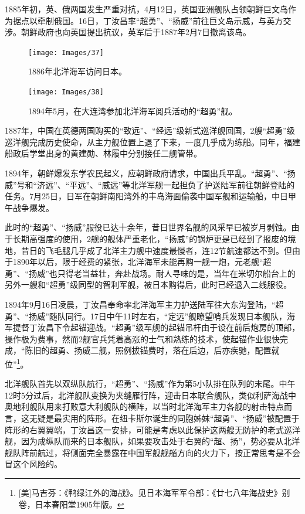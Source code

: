 \documentclass[12pt,UTF8]{ctexbook}
\begin{document}
1885年初，英、俄两国发生严重对抗，4月12日，英国亚洲舰队占领朝鲜巨文岛作为据点以牵制俄国。16日，丁汝昌率“超勇”、“扬威”前往巨文岛示威，与英方交涉。朝鲜政府也向英国提出抗议，英军后于1887年2月7日撤离该岛。

\begin{figure}[htbp]
	\centering
	\texttt{[image: Images/37]}
	\caption{1886年北洋海军访问日本。}
	\label{fig:1}
\end{figure}

\begin{figure}[htbp]
	\centering
	\texttt{[image: Images/38]}
	\caption{1894年5月，在大连湾参加北洋海军阅兵活动的“超勇”舰。}
	\label{fig:1}
\end{figure}

1887年，中国在英德两国购买的“致远”、“经远”级新式巡洋舰回国，2艘“超勇”级巡洋舰完成历史使命，从主力舰位置上退了下来，一度几乎成为练船。同年，福建船政后学堂出身的黄建勋、林履中分别接任二舰管带。

1894年，朝鲜爆发东学农民起义，应朝鲜政府请求，中国出兵平乱。“超勇”、“扬威”号和“济远”、“平远”、“威远”等北洋军舰一起担负了护送陆军前往朝鲜登陆的任务。7月25日，日军在朝鲜南阳湾外的丰岛海面偷袭中国军舰和运输船，中日甲午战争爆发。

此时的“超勇”、“扬威”服役已达十余年，昔日世界名舰的风采早已被岁月剥蚀。由于长期高强度的使用，2舰的舰体严重老化，“扬威”的锅炉更是已经到了报废的境地，昔日的飞毛腿几乎成了北洋主力舰中速度最慢者，连12节航速都达不到。但由于1890年以后，限于经费的紧张，北洋海军未能再购一舰一炮，元老舰“超勇”、“扬威”也只得老当益壮，奔赴战场。耐人寻味的是，当年在米切尔船台上的另外一艘和“超勇”级同型的智利军舰，被日本购得后，此时已经退入二线服役。

1894年9月16日凌晨，丁汝昌奉命率北洋海军主力护送陆军往大东沟登陆，“超勇”、“扬威”随队同行。17日中午11时左右，“定远”舰瞭望哨兵发现日本舰队，海军提督丁汝昌下令起锚迎战。“超勇”级军舰的起锚吊杆由于设在前后炮房的顶部，操作极为费事，然而2舰官兵凭着高涨的士气和熟练的技术，使起锚作业很快完成，“陈旧的超勇、扬威二舰，照例拔锚费时，落在后边，后亦疾驰，配置就位”\footnote{[美]马吉芬：《鸭绿江外的海战》。见日本海军军令部：《廿七八年海战史》别卷，日本春阳堂1905年版。}。

北洋舰队首先以双纵队航行，“超勇”、“扬威”作为第5小队排在队列的末尾。中午12时5分过后，北洋舰队变换为夹缝雁行阵，迎击日本联合舰队，类似利萨海战中奥地利舰队用来打败意大利舰队的横阵，以当时北洋海军主力各舰的射击特点而言，这无疑是最实用的阵形。在纽卡斯尔诞生的同胞姊妹“超勇”、“扬威”被配置于阵形的右翼翼端，丁汝昌这一安排，可能是考虑以此保护这两艘无防护的老式巡洋舰，因为成纵队而来的日本舰队，如果要攻击处于右翼的“超、扬”，势必要从北洋舰队阵前航过，将侧面完全暴露在中国军舰舰艏方向的火力下，按正常思考是不会冒这个风险的。
\end{document}
